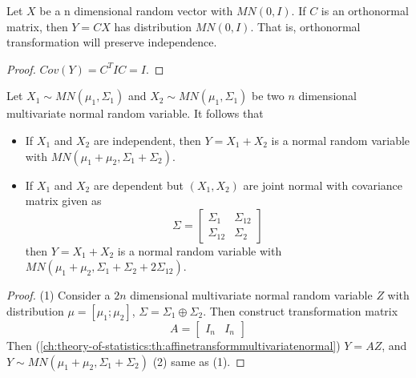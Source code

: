 \begin{refsection}
\begin{lemma}\label{ch:theory-of-statistics:th:multivariatenormalorthonormaltransformation}
Let $X$ be a n dimensional random vector with $MN(0,I)$. If $C$ is an orthonormal matrix, then $Y = CX$ has distribution $MN(0,I)$. That is, orthonormal transformation will preserve independence. 
\end{lemma}
\begin{proof}
	$Cov(Y) = C^TIC = I$.
\end{proof}



\begin{lemma}\label{ch:theory-of-statistics:th:sumofmultivariatenormalwithjointnormality}
Let $X_1\sim MN(\mu_1,\Sigma_1)$ and $X_2\sim MN(\mu_1,\Sigma_1)$ be two $n$ dimensional multivariate normal random variable. It follows that
\begin{itemize}
	\item If $X_1$ and $X_2$ are independent, then $Y = X_1 + X_2$ is a normal random variable with $MN(\mu_1 + \mu_2, \Sigma_1 + \Sigma_2)$.
	\item If $X_1$ and $X_2$ are dependent but $(X_1,X_2)$ are joint normal with covariance matrix given as
	$$\Sigma = \begin{bmatrix}
	\Sigma_1 & \Sigma_{12}\\
	\Sigma_{12} & \Sigma_2
	\end{bmatrix}
	$$
	then $Y = X_1 + X_2$ is a normal random variable with $MN(\mu_1 + \mu_2, \Sigma_1 + \Sigma_2 + 2\Sigma_{12})$.
\end{itemize}
\end{lemma}
\begin{proof}
(1)	
	Consider a $2n$ dimensional multivariate normal random variable $Z$ with distribution $\mu = [\mu_1;\mu_2]$, $\Sigma=\Sigma_1\oplus \Sigma_2$. Then construct transformation matrix
	$$A = \begin{bmatrix}
	I_n & I_n
	\end{bmatrix}$$
	Then (\autoref{ch:theory-of-statistics:th:affinetransformmultivariatenormal}) $Y = AZ$, and $Y\sim MN(\mu_1 + \mu_2, \Sigma_1 + \Sigma_2)$
(2)	same as (1).
\end{proof}




\end{refsection}

